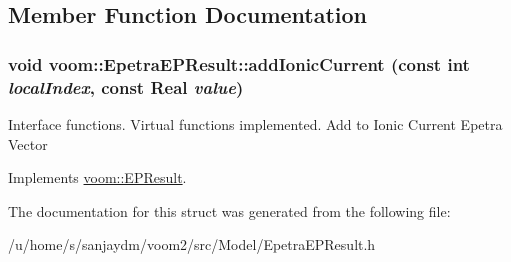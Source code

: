 \subsection{Member Function Documentation}
\hypertarget{structvoom_1_1_epetra_e_p_result_a3df34f3a42a943943577e7dce50d1036}{
\subsubsection[{addIonicCurrent}]{\setlength{\rightskip}{0pt plus 5cm}void voom::EpetraEPResult::addIonicCurrent (const int {\em localIndex}, \/  const Real {\em value})}}
\label{structvoom_1_1_epetra_e_p_result_a3df34f3a42a943943577e7dce50d1036}
Interface functions. Virtual functions implemented. Add to Ionic Current Epetra Vector 

Implements \hyperlink{structvoom_1_1_e_p_result}{voom::EPResult}.

The documentation for this struct was generated from the following file:\begin{DoxyCompactItemize}
\item 
/u/home/s/sanjaydm/voom2/src/Model/EpetraEPResult.h\end{DoxyCompactItemize}
